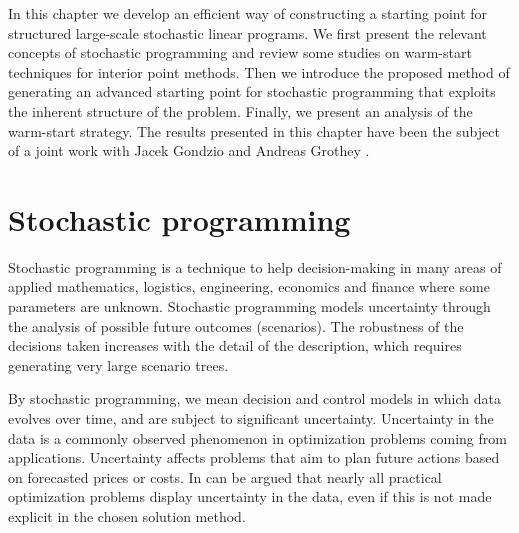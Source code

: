 
%
%
\label{ch:Warmstart}

In this chapter we develop an efficient way of constructing a 
starting point for structured large-scale stochastic linear programs.
We first present the relevant
concepts of stochastic programming and review some studies on 
warm-start techniques for interior point methods. Then we introduce 
the proposed method of generating an advanced starting point for 
stochastic programming that exploits the inherent structure of the
problem. Finally, we present an analysis of the warm-start strategy.
The results presented in this chapter have been the subject
of a joint work with Jacek Gondzio and Andreas Grothey
\cite{ColomboGondzioGrothey06}. 


%
%
\section{Stochastic programming}

Stochastic programming \cite{BirgeLouveaux,KallWallace}
is a technique to help decision-making 
in many areas of applied mathematics, logistics, engineering, economics and 
finance where some parameters are unknown.
Stochastic programming models uncertainty through the analysis 
of possible future outcomes (scenarios). The 
robustness of the decisions taken increases with the detail of the 
description, which requires generating very large scenario trees.


By stochastic programming, we mean decision and control models in which 
data evolves over time, and are subject to significant uncertainty.
%
Uncertainty in the data is a commonly observed phenomenon in
optimization problems coming from applications. Uncertainty
affects problems that aim to plan future actions based on forecasted
prices or costs. In can be argued that nearly all practical
optimization problems display uncertainty in the data, even if this is
not made explicit in the chosen solution method. 

